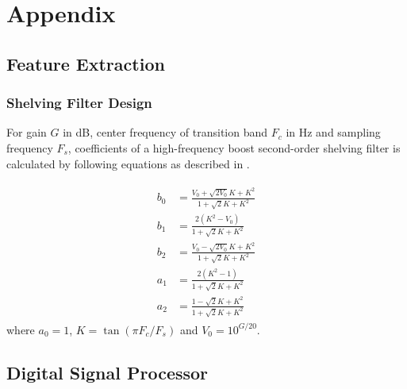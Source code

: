 \appendix
\chapter{Appendix}


\section{Feature Extraction}

\subsection{Shelving Filter Design}
\label{shelving-appendix}
For gain $G$ in dB, center frequency of transition band $F_c$ in Hz and sampling frequency $F_s$, coefficients of a high-frequency boost second-order shelving filter is calculated by following equations as described in \cite{DAFX_book}.

\begin{align}
\begin{split}
b_0 &= \frac{V_0 + \sqrt{2V_0} K + K^2}{1 + \sqrt{2} K + K^2}\\
b_1 &= \frac{2 (K^2 - V_0)}{1 + \sqrt{2} K + K^2}\\
b_2 &= \frac{V_0 - \sqrt{2V_0} K + K^2}{1 + \sqrt{2} K + K^2}\\
a_1 &= \frac{2 (K^2 - 1)}{1 + \sqrt{2} K + K^2}\\
a_2 &= \frac{1 - \sqrt{2}K + K^2}{1 + \sqrt{2}K + K^2}
\end{split}
\end{align}
where $a_0 = 1$, $K = \tan(\pi F_c / F_s)$ and $V_0 = 10^{G/20}$.


\section{Digital Signal Processor}

